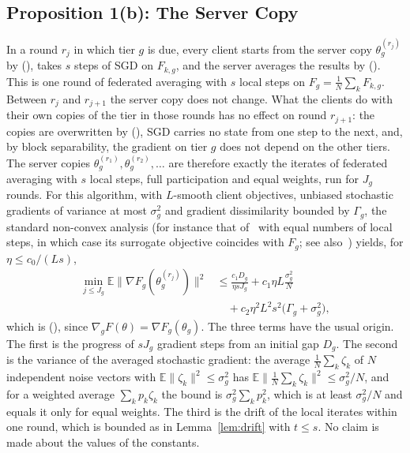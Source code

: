 \documentclass[journal]{IEEEtran}
\begin{document}
\subsection{Proposition 1(b): The Server Copy}
In a round $r_j$ in which tier $g$ is due, every client starts from the server copy $\theta_g^{(r_j)}$ by (), takes $s$ steps of SGD on $F_{k,g}$, and the server averages the results by (). This is one round of federated averaging with $s$ local steps on $F_g=\frac1N\sum_kF_{k,g}$. Between $r_j$ and $r_{j+1}$ the server copy does not change. What the clients do with their own copies of the tier in those rounds has no effect on round $r_{j+1}$: the copies are overwritten by (), SGD carries no state from one step to the next, and, by block separability, the gradient on tier $g$ does not depend on the other tiers. The server copies $\theta_g^{(r_1)},\theta_g^{(r_2)},\dots$ are therefore exactly the iterates of federated averaging with $s$ local steps, full participation and equal weights, run for $J_g$ rounds. For this algorithm, with $L$-smooth client objectives, unbiased stochastic gradients of variance at most $\sigma_g^2$ and gradient dissimilarity bounded by $\Gamma_g$, the standard non-convex analysis (for instance that of~\cite{wang2020fednova} with equal numbers of local steps, in which case its surrogate objective coincides with $F_g$; see also~\cite{karimireddy2020,wang2021coop}) yields, for $\eta\le c_0/(Ls)$,
\begin{align*}
\min_{j\le J_g}\mathbb E\big\|\nabla F_g(\theta_g^{(r_j)})\big\|^2&\le\frac{c_1D_g}{\eta sJ_g}+c_1\eta L\frac{\sigma_g^2}{N}\\
&\quad+c_2\eta^2L^2s^2\big(\Gamma_g+\sigma_g^2\big),
\end{align*}
which is (), since $\nabla_gF(\theta)=\nabla F_g(\theta_g)$. The three terms have the usual origin. The first is the progress of $sJ_g$ gradient steps from an initial gap $D_g$. The second is the variance of the averaged stochastic gradient: the average $\frac1N\sum_k\zeta_k$ of $N$ independent noise vectors with $\mathbb E\|\zeta_k\|^2\le\sigma_g^2$ has $\mathbb E\|\frac1N\sum_k\zeta_k\|^2\le\sigma_g^2/N$, and for a weighted average $\sum_kp_k\zeta_k$ the bound is $\sigma_g^2\sum_kp_k^2$, which is at least $\sigma_g^2/N$ and equals it only for equal weights. The third is the drift of the local iterates within one round, which is bounded as in Lemma~\ref{lem:drift} with $t\le s$. No claim is made about the values of the constants.
\end{document}
